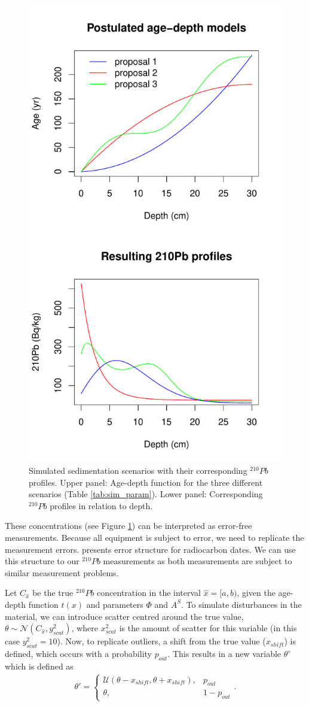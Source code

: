 \documentclass [10pt] {article}
\begin{document}
\begin{figure}[!h]
 \centering
  \includegraphics[width=0.5\linewidth]{Chronology-profile.pdf}
	\caption{Simulated sedimentation scenarios with their corresponding $^{210}Pb$ profiles. Upper panel: Age-depth function for the three different scenarios (Table \ref{tab:sim_param}). Lower panel: Corresponding $^{210}Pb$ profiles in relation to depth.}
  \label{fig:true_210}
\end{figure}

	These concentrations (see Figure \ref{fig:true_210}) can be interpreted as error-free measurements. 
Because all equipment is subject to error, we need to replicate the measurement errors. 
\citet{Blaauw2018} presents error structure for radiocarbon dates. 
We can use this structure to our $^{210}Pb$ measurements as both measurements are subject to similar measurement problems. 

	Let $C_{\hat{x}}$ be the true  $^{210}Pb$ concentration in the interval $\hat{x}=[a,b)$, given the age-depth function $t(x)$ and parameters $\Phi$ and $A^S$. 
To simulate disturbances in the material, we can introduce scatter centred around the true value, $\theta \sim \mathcal{N}\left(C_{\hat{x}},y^2_{scat}\right)$, where $x^2_{scat}$ is the amount of scatter for this variable (in this case $y^2_{scat}=10$). 
Now, to replicate outliers, a shift from the true value ($x_{shift}$) is defined, which occurs with a probability $p_{out}$. This results in a new variable $\theta'$ which is defined as
\begin{align}
	\theta' = \begin{cases}
			\mathcal{U}(\theta - x_{shift},\theta + x_{shift}), &  p_{out} \\
			\theta, & 1-p_{out}
		\end{cases}.
\end{align}
\end{document}
